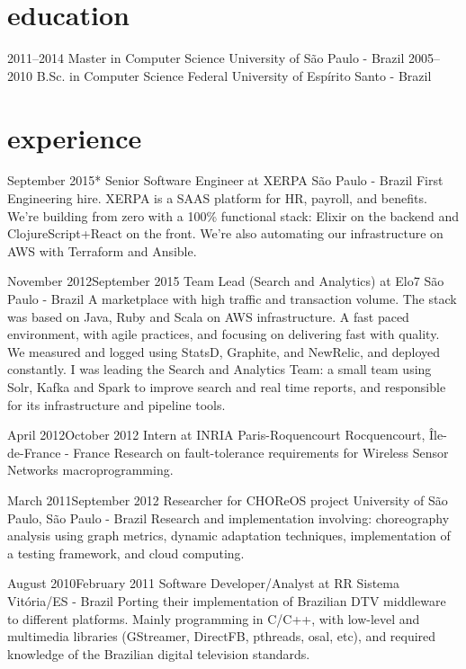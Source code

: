 \documentclass{nirev-cv}
\begin{document}
\section{education}

\begin{entrylist}

\entry
  {2011–2014}
  {Master in Computer Science}
  {University of São Paulo - Brazil}{}
\entry
  {2005–2010}
  {B.Sc. in Computer Science}
  {Federal University of Espírito Santo - Brazil}{}
\end{entrylist}

\section{experience}

\workentry
    {September 2015}{*}
    {Senior Software Engineer at XERPA}
    {São Paulo - Brazil}
    {First Engineering hire. XERPA is a SAAS platform for HR, payroll, and benefits. We're building from zero with a 100\% functional stack: Elixir on the backend and ClojureScript+React on the front. We're also automating our infrastructure on AWS with Terraform and Ansible.}

\workentry
  {November 2012}{September 2015}
  {Team Lead (Search and Analytics) at Elo7}
  {São Paulo - Brazil}
  {A marketplace with high traffic and transaction volume. The stack was based on Java, Ruby and Scala on AWS infrastructure. A fast paced environment, with agile practices, and focusing on delivering fast with quality. We measured and logged using StatsD, Graphite, and NewRelic, and deployed constantly. I was leading the Search and Analytics Team: a small team using Solr, Kafka and Spark to improve search and real time reports, and responsible for its infrastructure and pipeline tools.}

\workentry
  {April 2012}{October 2012}
  {Intern at INRIA Paris-Roquencourt}
  {Rocquencourt, Île-de-France - France}
  {Research on fault-tolerance requirements for Wireless Sensor Networks macroprogramming.}

\workentry
  {March 2011}{September 2012}
  {Researcher for CHOReOS project}
  {University of São Paulo, São Paulo - Brazil}
  {Research and implementation involving: choreography analysis using graph metrics,
  dynamic adaptation techniques, implementation of a testing framework, and cloud computing.}

\workentry
  {August 2010}{February 2011}
  {Software Developer/Analyst at RR Sistema}
  {Vitória/ES - Brazil}
  {Porting their implementation of Brazilian DTV middleware to different platforms.
  Mainly programming in C/C++, with low-level and multimedia libraries (GStreamer, DirectFB, pthreads, osal, etc),
  and required knowledge of the Brazilian digital television standards.}
\end{document}
